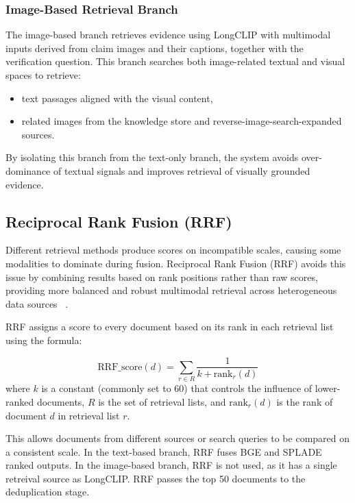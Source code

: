 \subsubsection{Image-Based Retrieval Branch}

The image-based branch retrieves evidence using LongCLIP with multimodal inputs derived from claim images and their captions, together with the verification question. This branch searches both image-related textual and visual spaces to retrieve:
\begin{itemize}
    \item text passages aligned with the visual content,
    \item related images from the knowledge store and reverse-image-search-expanded sources.
\end{itemize}

By isolating this branch from the text-only branch, the system avoids over-dominance of textual signals and improves retrieval of visually grounded evidence.

\subsection{Reciprocal Rank Fusion (RRF)}

Different retrieval methods produce scores on incompatible scales, causing some modalities to dominate during fusion. Reciprocal Rank Fusion (RRF) avoids this issue by combining results based on rank positions rather than raw scores, providing more balanced and robust multimodal retrieval across heterogeneous data sources ~\cite{RyanBogan2025Nov}.

RRF assigns a score to every document based on its rank in each retrieval list using the formula:

\begin{equation}
    \text{RRF\_score}(d) = \sum_{r \in R} \frac{1}{k + \text{rank}_r(d)}
\end{equation}
where $k$ is a constant (commonly set to 60) that controls the influence of lower-ranked documents, $R$ is the set of retrieval lists, and $\text{rank}_r(d)$ is the rank of document $d$ in retrieval list $r$.

This allows documents from different sources or search queries to be compared on a consistent scale. In the text-based branch, RRF fuses BGE and SPLADE ranked outputs. In the image-based branch, RRF is not used, as it has a single retreival source as LongCLIP. RRF passes the top 50 documents to the deduplication stage.

